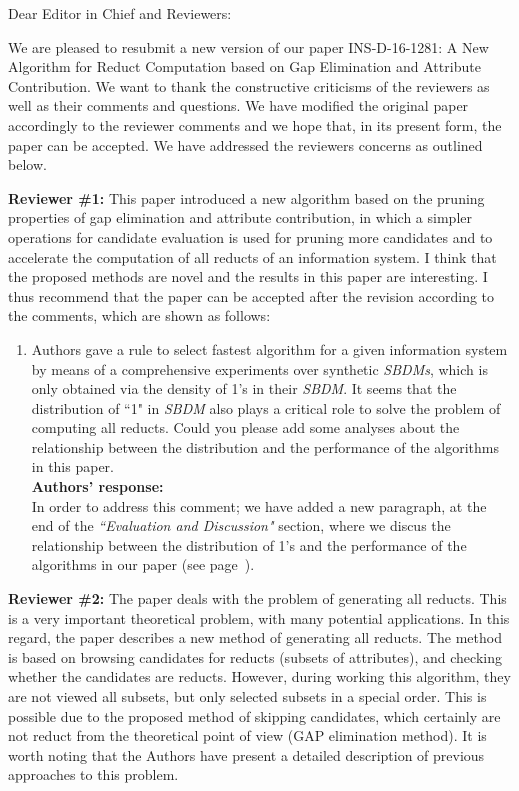 \documentclass{letter}
\begin{document}
\begin{letter}{}
  \opening{Dear Editor in Chief and Reviewers:}

  We are pleased to resubmit a new version of our paper INS-D-16-1281: A New Algorithm for Reduct Computation based on Gap Elimination and Attribute Contribution. We want to thank the constructive criticisms of the reviewers as well as their comments and questions. We have modified the original paper accordingly to the reviewer comments and we hope that, in its present form, the paper can be accepted. We have addressed the reviewers concerns as outlined below.

  \textbf{Reviewer \#1:} 
  This paper introduced a new algorithm based on the pruning properties of gap elimination and attribute contribution, in which a simpler operations for candidate evaluation is used for pruning more candidates and to accelerate the computation of all reducts of an information system. I think that the proposed methods are novel and the results in this paper are interesting. I thus recommend that the paper can be accepted after the revision according to the comments, which are shown as follows:

  \begin{enumerate}
    \item Authors gave a rule to select fastest algorithm for a given information system by means of a comprehensive experiments over synthetic \textit{SBDMs}, which is only obtained via the density of 1's in their \textit{SBDM}. It seems that the distribution of ``1" in \textit{SBDM} also plays a critical role to solve the problem of computing all reducts. Could you please add some analyses about the relationship between the distribution and the performance of the algorithms in this paper.\\
    \textbf{Authors’ response:} \\
    In order to address this comment; we have added a new paragraph, at the end of the \textit{``Evaluation and Discussion"} section, where we discus the relationship between the distribution of 1's and the performance of the algorithms in our paper (see page~\pageref{par:distribution}).
  \end{enumerate}
  
  \textbf{Reviewer \#2:}
  The paper deals with the problem of generating all reducts. This is a very important theoretical problem, with many potential applications. In this regard, the paper describes a new method of generating all reducts. The method is based on browsing candidates for reducts (subsets of attributes), and checking whether the candidates are reducts. However, during working this algorithm, they are not viewed all subsets, but only selected subsets in a special order. This is possible due to the proposed method of skipping candidates, which certainly are not reduct from the theoretical point of view (GAP elimination method).
  It is worth noting that the Authors have present a detailed description of previous approaches to this problem.
  

\end{letter}
\end{document}
